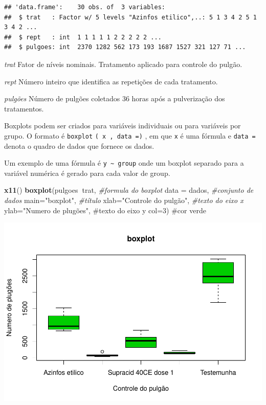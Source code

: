 \documentclass[
]{book}
\newenvironment{Shaded}{\begin{snugshade}}{\end{snugshade}}
\newcommand{\CommentTok}[1]{\textcolor[rgb]{0.56,0.35,0.01}{\textit{#1}}}
\newcommand{\DataTypeTok}[1]{\textcolor[rgb]{0.13,0.29,0.53}{#1}}
\newcommand{\KeywordTok}[1]{\textcolor[rgb]{0.13,0.29,0.53}{\textbf{#1}}}
\newcommand{\NormalTok}[1]{#1}
\newcommand{\OperatorTok}[1]{\textcolor[rgb]{0.81,0.36,0.00}{\textbf{#1}}}
\newcommand{\StringTok}[1]{\textcolor[rgb]{0.31,0.60,0.02}{#1}}
\begin{document}
\begin{verbatim}
## 'data.frame':    30 obs. of  3 variables:
##  $ trat   : Factor w/ 5 levels "Azinfos etilico",..: 5 1 3 4 2 5 1 3 4 2 ...
##  $ rept   : int  1 1 1 1 1 2 2 2 2 2 ...
##  $ pulgoes: int  2370 1282 562 173 193 1687 1527 321 127 71 ...
\end{verbatim}

\emph{trat}
Fator de níveis nominais. Tratamento aplicado para controle do pulgão.

\emph{rept}
Número inteiro que identifica as repetições de cada tratamento.

\emph{pulgões}
Número de pulgões coletados 36 horas após a pulverização dos tratamentos.

Boxplots podem ser criados para variáveis individuais ou para variáveis por grupo. O formato é \texttt{boxplot} \texttt{(\ x\ ,\ data\ =)} , em que \texttt{x} é uma fórmula e \texttt{data\ =} denota o quadro de dados que fornece os dados.

Um exemplo de uma fórmula é \texttt{y\ \textasciitilde{}\ group} onde um boxplot separado para a variável numérica é gerado para cada valor de group.

\begin{Shaded}
\begin{Highlighting}[]
\KeywordTok{x11}\NormalTok{()}
\KeywordTok{boxplot}\NormalTok{(pulgoes}\OperatorTok{~}\NormalTok{trat,              }\CommentTok{#formula do boxplot}
        \DataTypeTok{data =}\NormalTok{ dados,              }\CommentTok{#conjunto de dados}
        \DataTypeTok{main=}\StringTok{"boxplot"}\NormalTok{,            }\CommentTok{#título}
        \DataTypeTok{xlab=}\StringTok{"Controle do pulgão"}\NormalTok{, }\CommentTok{#texto do eixo x }
        \DataTypeTok{ylab=}\StringTok{"Numero de plugões",  #texto do eixo y}
\StringTok{        col=3)                     #cor verde  }
\end{Highlighting}
\end{Shaded}

\includegraphics{TudodoR_files/figure-latex/unnamed-chunk-171-1.pdf}
\end{document}
